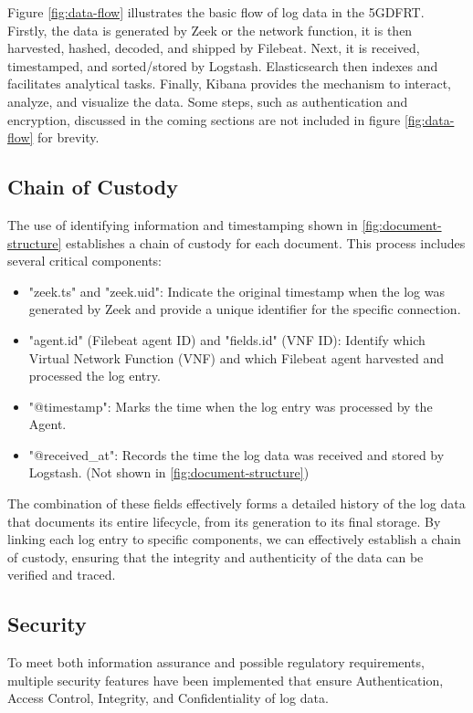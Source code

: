 \documentclass[final,1p,times,authoryear]{elsarticle}
\begin{document}
Figure \ref{fig:data-flow} illustrates the basic flow of log data in the 5GDFRT. Firstly, the data is generated by Zeek or the network function, it is then harvested, hashed, decoded, and shipped by Filebeat. Next, it is received, timestamped, and sorted/stored by Logstash. Elasticsearch then indexes and facilitates analytical tasks. Finally, Kibana provides the mechanism to interact, analyze, and visualize the data. Some steps, such as authentication and encryption, discussed in the coming sections are not included in figure \ref{fig:data-flow} for brevity.

\subsection{Chain of Custody}
\label{sub3sec4}
The use of identifying information and timestamping shown in \ref{fig:document-structure} establishes a chain of custody for each document. This process includes several critical components:

\begin{itemize}
	\item "zeek.ts" and "zeek.uid": Indicate the original timestamp when the log was generated by Zeek and provide a unique identifier for the specific connection.
	\item "agent.id" (Filebeat agent ID) and "fields.id" (VNF ID): Identify which Virtual Network Function (VNF) and which Filebeat agent harvested and processed the log entry.
	\item "@timestamp": Marks the time when the log entry was processed by the Agent.
	\item "@received\_at": Records the time the log data was received and stored by Logstash. (Not shown in \ref{fig:document-structure})
\end{itemize}

The combination of these fields effectively forms a detailed history of the log data that documents its entire lifecycle, from its generation to its final storage. By linking each log entry to specific components, we can effectively establish a chain of custody, ensuring that the integrity and authenticity of the data can be verified and traced.

\subsection{Security}
\label{sub3sec5}
To meet both information assurance and possible regulatory requirements, multiple security features have been implemented that ensure Authentication, Access Control, Integrity, and Confidentiality of log data.
\end{document}
